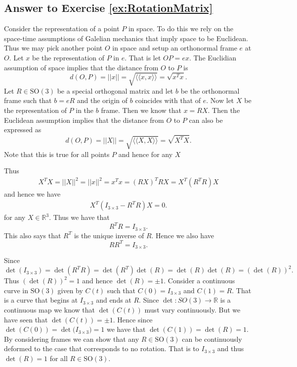 \documentclass[graybox,envcountchap,sectrefs]{svmonoMuga}
\begin{document}
\subsection*{Answer to Exercise \ref{ex:RotationMatrix}}
Consider the representation of a point $P$ in space. To do this we rely on the space-time assumptions of Galelian mechanics that imply space to be Euclidean. Thus we may pick another point $O$ in space and setup an orthonormal frame $e$ at $O$. Let $x$ be the representation of $P$ in $e$. That is let $OP=ex$. The Euclidian assumption of space implies that the distance from $O$ to $P$ is
\[
d(O,P)=||x||=\sqrt{\langle\langle x,x\rangle\rangle}=\sqrt{x^Tx}.
\]
Let $R\in \mathrm{SO}(3)$ be a special orthogonal matrix and let $b$ be the orthonormal frame such that $b=eR$ and the origin of $b$ coincides with that of $e$. Now let $X$ be the representation of $P$ in the $b$ frame. Then we know that $x=RX$. Then the Euclidean assumption implies that the distance from $O$ to $P$ can also be expressed as
\[
d(O,P)=||X||=\sqrt{\langle\langle X,X\rangle\rangle}=\sqrt{X^TX}.
\]
Note that this is true for all points $P$ and hence for any $X$

Thus
\begin{align*}
X^TX=||X||^2=||x||^2=x^Tx=(RX)^TRX=X^T(R^TR)X
\end{align*}
and hence we have
\begin{align*}
X^T(I_{3\times 3}-R^TR)X=0.
\end{align*}
for any $X\in\mathbb{R}^3$. Thus we have that
\[
R^TR=I_{3\times 3}.
\]
This also says that $R^T$ is the unique inverse of $R$. Hence we also have 
\[
RR^T=I_{3\times 3}.
\]

Since
\[
\det{(I_{3\times3})}=\det{(R^TR)}=\det{(R^T)}\det{(R)}=\det{(R)}\det{(R)}=(\det{(R)})^2.
\]
Thus $(\det{(R)})^2=1$ and hence $\det{(R)}=\pm1$.
Consider a continuous curve in $\mathrm{SO}(3)$ given by $C(t)$ such that $C(0)=I_{3\times 3}$ and $C(1)=R$. That is a curve that begins at $I_{3\times 3}$ and ends at $R$.
Since $\det :SO(3)\to \mathbb{R}$ is a continuous map we know that $\det{(C(t))}$ must vary continuously. But we have seen that $\det{(C(t))}=\pm 1$. Hence since $\det{(C(0))}=\det{(I_{3\times 3}})=1$ we have that $\det{(C(1))}=\det{(R)}=1$. By considering frames we can show that any $R\in \mathrm{SO}(3)$ can be continuously deformed to the case that corresponds to no rotation. That is to $I_{3\times 3}$ and thus  $\det{(R)}=1$ for all $R\in \mathrm{SO}(3)$.

\end{document}
